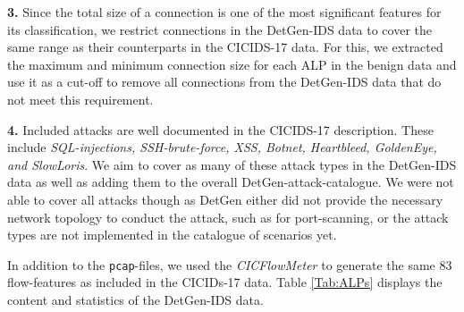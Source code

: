 \textbf{3.} Since the total size of a connection is one of the most significant features for its classification, we restrict connections in the DetGen-IDS data to cover the same range as their counterparts in the CICIDS-17 data. For this, we extracted the maximum and minimum connection size for each ALP in the benign data and use it as a cut-off to remove all connections from the DetGen-IDS data that do not meet this requirement.

\textbf{4.} Included attacks are well documented in the CICIDS-17 description. These include \textit{SQL-injections, SSH-brute-force, XSS, Botnet, Heartbleed, GoldenEye, and SlowLoris}. We aim to cover as many of these attack types in the DetGen-IDS data as well as adding them to the overall DetGen-attack-catalogue. We were not able to cover all attacks though as DetGen either did not provide the necessary network topology to conduct the attack, such as for port-scanning, or the attack types are not implemented in the catalogue of scenarios yet. 

In addition to the \texttt{pcap}-files, we used the \textit{CICFlowMeter} to generate the same 83 flow-features as included in the CICIDs-17 data. Table \ref{Tab:ALPs} displays the content and statistics of the DetGen-IDS data.
%
%
%
%
%
%
%



